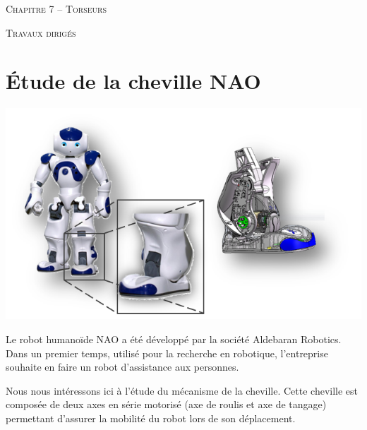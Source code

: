 \documentclass[10pt]{article}
\begin{document}

\begin{center}
\large{\textsc{Chapitre 7 -- Torseurs}}
\end{center}

\begin{center}
\textsc{Travaux dirigés}
\end{center}

\normalsize


 \renewcommand{\baselinestretch}{1.2}


\section{Étude de la cheville NAO}


\begin{minipage}[c]{.5\linewidth}
\begin{center}
\includegraphics[width=.95\textwidth]{images/nao_cheville}
\end{center}
\end{minipage}\hfill
\begin{minipage}[c]{.5\linewidth}
Le robot humanoïde NAO a été développé par la société Aldebaran Robotics. Dans un premier temps, utilisé pour la recherche en robotique, l'entreprise souhaite en faire un robot d'assistance aux personnes. 

Nous nous intéressons ici à l'étude du mécanisme de la cheville. Cette cheville est composée de deux axes en série motorisé (axe de roulis et axe de tangage) permettant d'assurer la mobilité du robot lors de son déplacement.
\end{minipage}
\end{document}
